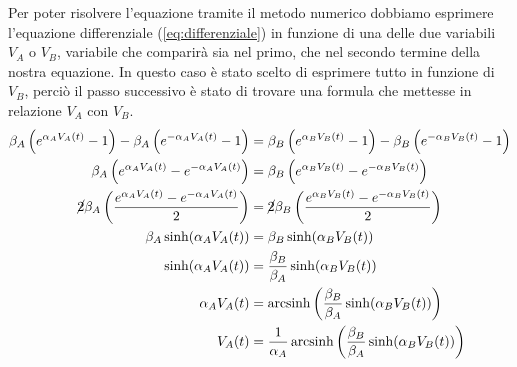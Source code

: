	Per poter risolvere l'equazione tramite il metodo numerico dobbiamo esprimere l'equazione differenziale (\ref{eq:differenziale}) in funzione di una delle due variabili $V_{A}$ o $V_{B}$, variabile che comparirà sia nel primo, che nel secondo termine della nostra equazione. In questo caso è stato scelto di esprimere tutto in funzione di $V_{B}$, perciò il passo successivo è stato di trovare una formula che mettesse in relazione $V_{A}$ con $V_{B}$.
	\begin{equation}
		\label{eq:tensione_A_B}
		\begin{split}
			\beta_{A}\left(e^{\alpha_{A}V_{A}(t)}-1\right)-\beta_{A}\left(e^{-\alpha_{A}V_{A}(t)}-1\right) &= \beta_{B}\left(e^{\alpha_{B}V_{B}(t)}-1\right)-\beta_{B}\left(e^{-\alpha_{B}V_{B}(t)}-1\right)\\
			\beta_{A}\left(e^{\alpha_{A}V_{A}(t)}-e^{-\alpha_{A}V_{A}(t)}\right) &= \beta_{B}\left(e^{\alpha_{B}V_{B}(t)}-e^{-\alpha_{B}V_{B}(t)}\right)\\
			\cancel{2}\beta_{A}\left(\frac{e^{\alpha_{A}V_{A}(t)}-e^{-\alpha_{A}V_{A}(t)}}{2}\right) &= \cancel{2}\beta_{B}\left(\frac{e^{\alpha_{B}V_{B}(t)}-e^{-\alpha_{B}V_{B}(t)}}{2}\right)\\
			\beta_{A} \sinh(\alpha_{A}V_{A}(t)) &= \beta_{B} \sinh(\alpha_{B}V_{B}(t))\\
			\sinh(\alpha_{A}V_{A}(t)) &= \frac{\beta_{B}}{\beta_{A}} \sinh(\alpha_{B}V_{B}(t))\\
			\alpha_{A}V_{A}(t) &= \operatorname{arcsinh} \left(\frac{\beta_{B}}{\beta_{A}} \sinh(\alpha_{B}V_{B}(t))\right)\\
			V_{A}(t) &= \frac{1}{\alpha_{A}} \operatorname{arcsinh} \left(\frac{\beta_{B}}{\beta_{A}} \sinh(\alpha_{B}V_{B}(t))\right)
		\end{split}
	\end{equation}
	\pagebreak
	

